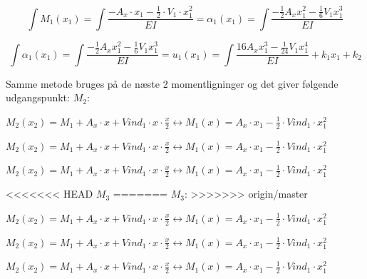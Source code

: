 \begin{equation}
	\int M_1(x_1) = \int \frac{- A_x\cdot x_1 - \frac{1}{2}\cdot V_1 \cdot x_1^2}{EI}
	= \alpha_1(x_1) = \int \frac{-\frac{1}{2} A_x x_1^2 - \frac{1}{6}  V_1  x_1^3 }{EI}
\end{equation}

\begin{equation}
	\int \alpha_1(x_1) = \int \frac{-\frac{1}{2} A_x x_1^2 - \frac{1}{6}  V_1  x_1^3 }{EI}
	= u_1(x_1) = \int \frac{{1}{6} A_x x_1^3 - \frac{1}{24}  V_1  x_1^4 }{EI} + k_1 x_1 + k_2
\end{equation}

Samme metode bruges på de næste 2 momentligninger og det giver følgende udgangspunkt: 
\newline
$M_2$:
\begin{center}
	$M_2(x_2) = M_1 + A_x \cdot x + Vind_1\cdot x\cdot \frac{x}{2} \leftrightarrow M_1(x) = A_x\cdot x_1 -\frac{1}{2}\cdot Vind_1 \cdot x_1^2$
\end{center}

\begin{center}
	$M_2(x_2) = M_1 + A_x \cdot x + Vind_1\cdot x\cdot \frac{x}{2} \leftrightarrow M_1(x) = A_x\cdot x_1 -\frac{1}{2}\cdot Vind_1 \cdot x_1^2$
\end{center}

\begin{center}
	$M_2(x_2) = M_1 + A_x \cdot x + Vind_1\cdot x\cdot \frac{x}{2} \leftrightarrow M_1(x) = A_x\cdot x_1 -\frac{1}{2}\cdot Vind_1 \cdot x_1^2$
\end{center}

<<<<<<< HEAD
$M_3$ 
=======
$M_3$: 
>>>>>>> origin/master

\begin{center}
	$M_2(x_2) = M_1 + A_x \cdot x + Vind_1\cdot x\cdot \frac{x}{2} \leftrightarrow M_1(x) = A_x\cdot x_1 -\frac{1}{2}\cdot Vind_1 \cdot x_1^2$
\end{center}

\begin{center}
	$M_2(x_2) = M_1 + A_x \cdot x + Vind_1\cdot x\cdot \frac{x}{2} \leftrightarrow M_1(x) = A_x\cdot x_1 -\frac{1}{2}\cdot Vind_1 \cdot x_1^2$
\end{center}

\begin{center}
	$M_2(x_2) = M_1 + A_x \cdot x + Vind_1\cdot x\cdot \frac{x}{2} \leftrightarrow M_1(x) = A_x\cdot x_1 -\frac{1}{2}\cdot Vind_1 \cdot x_1^2$
\end{center}

